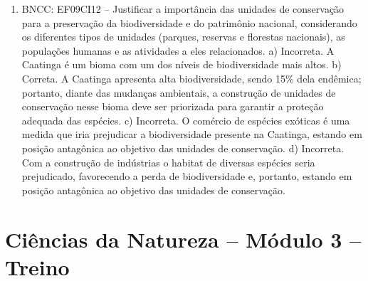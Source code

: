 \begin{enumerate}
\item
BNCC: EF09CI12 -- Justificar a importância das unidades de
conservação para a preservação da biodiversidade e do patrimônio
nacional, considerando os diferentes tipos de unidades (parques,
reservas e florestas nacionais), as populações humanas e as atividades a
eles relacionados.
a) Incorreta. A Caatinga é um bioma com um dos níveis de
  biodiversidade mais altos.
b) Correta. A Caatinga apresenta alta biodiversidade, sendo 15\% dela
  endêmica; portanto, diante das mudanças ambientais, a construção de
  unidades de conservação nesse bioma deve ser priorizada para garantir a proteção adequada das espécies.
c) Incorreta. O comércio de espécies exóticas é uma medida que iria
  prejudicar a biodiversidade presente na Caatinga, estando em posição
  antagônica ao objetivo das unidades de conservação.
d) Incorreta. Com a construção de indústrias o habitat de diversas
  espécies seria prejudicado, favorecendo a perda de biodiversidade e,
  portanto, estando em posição antagônica ao objetivo das unidades de conservação.
\end{enumerate}

\section*{Ciências da Natureza – Módulo 3 –  Treino}

